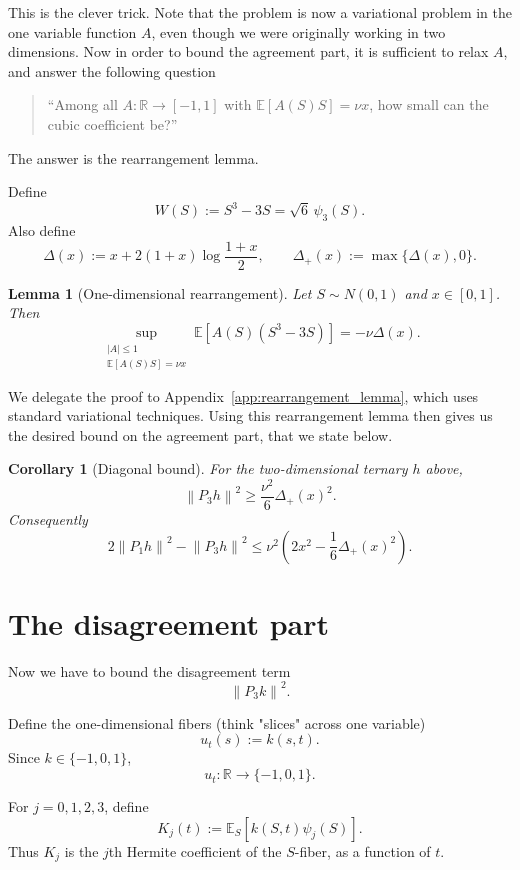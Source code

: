 \documentclass[11pt]{article}
\newtheorem{lemma}[theorem]{Lemma}
\newtheorem{corollary}[theorem]{Corollary}
\newcommand{\R}{\mathbb R}
\newcommand{\E}{\mathbb E}
\newcommand{\norm}[1]{\left\|#1\right\|}
\begin{document}
This is the clever trick. Note that the problem is now a variational problem in the one variable function $A$, even though we were originally working in two dimensions. Now in order to bound the agreement part, it is sufficient to relax $A$, and answer the following question

\begin{quote}
``Among all $A:\R\to[-1,1]$ with $\E[A(S)S]=\nu x$, how small can the cubic coefficient be?''
\end{quote}

The answer is the rearrangement lemma.

Define
\[
        W(S):=S^3-3S=\sqrt6\,\psi_3(S).
\]
Also define
\[
        \Delta(x):=x+2(1+x)\log\frac{1+x}{2},
        \qquad
        \Delta_+(x):=\max\{\Delta(x),0\}.
\]

\begin{lemma}[One-dimensional rearrangement]
Let $S\sim N(0,1)$ and $x\in[0,1]$.  Then
\[
        \sup_{\substack{|A|\le1\\ \E[A(S)S]=\nu x}}
        \E[A(S)(S^3-3S)]
        =-\nu\Delta(x).
\]
\end{lemma}

We delegate the proof to Appendix~\ref{app:rearrangement_lemma}, which uses standard variational techniques. Using this rearrangement lemma then gives us the desired bound on the agreement part, that we state below. 

\begin{corollary}[Diagonal bound]
For the two-dimensional ternary $h$ above,
\[
        \norm{P_3h}^2\ge \frac{\nu^2}{6}\Delta_+(x)^2.
\]
Consequently
\[
        2\norm{P_1h}^2-\norm{P_3h}^2
        \le
        \nu^2\left(2x^2-\frac16\Delta_+(x)^2\right).
\]
\end{corollary}

\section{The disagreement part}

Now we have to bound the disagreement term
\[
        \norm{P_3k}^2.
\]

Define the one-dimensional fibers (think "slices" across one variable) 
\[
        u_t(s):=k(s,t).
\]
Since $k\in\{-1,0,1\}$,
\[
        u_t:\R\to\{-1,0,1\}.
\]

For $j=0,1,2,3$, define
\[
        K_j(t):=\E_S[k(S,t)\psi_j(S)].
\]
Thus $K_j$ is the $j$th Hermite coefficient of the $S$-fiber, as a function of $t$.
\end{document}
